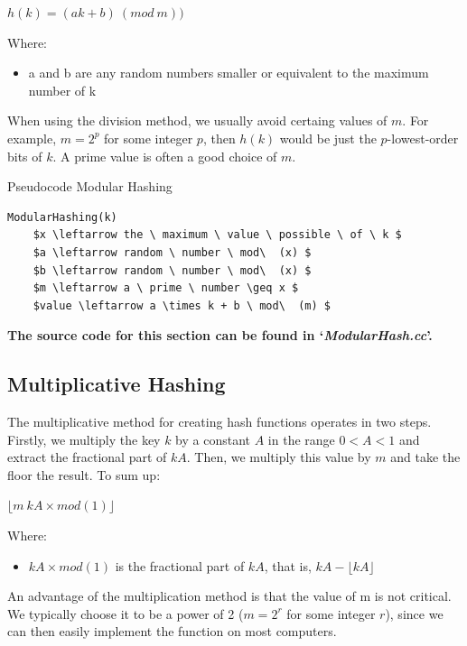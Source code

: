 \documentclass[12pt]{article}
\begin{document}
\begin{center} $h(k) = (ak+b)\  (mod \ m))$ \end{center}

Where: 
\begin{itemize}
\item a and b are any random numbers smaller or equivalent to the maximum number of k 
\end{itemize}

When using the division method, we usually avoid certaing values of $m$. For example, $m = 2^p$ for some integer $p$, then $h(k)$ would be just the $p$-lowest-order bits of $k$. A prime value is often a good choice of $m$.

\begin{center}
\begin{large}
Pseudocode Modular Hashing
\end{large}
\end{center}

\begin{lstlisting}[mathescape=true]
ModularHashing(k)
	$x \leftarrow the \ maximum \ value \ possible \ of \ k $
	$a \leftarrow random \ number \ mod\  (x) $
	$b \leftarrow random \ number \ mod\  (x) $
	$m \leftarrow a \ prime \ number \geq x $
	$value \leftarrow a \times k + b \ mod\  (m) $

\end{lstlisting}

\textbf{The source code for this section can be found in `\textit{ModularHash.cc}'.}
\bigskip

\subsection{Multiplicative Hashing}
The multiplicative method for creating hash functions operates in two steps.
Firstly, we multiply the key $k$ by a constant $A$ in the range $0<A<1$ and extract the fractional part of $kA$. Then, we multiply this value by $m$ and take the floor the result. To sum up:  

\begin{center}
 $ \lfloor m\ kA \times mod(1)  \rfloor$
\end{center}
Where:
\begin{itemize}
\item $kA  \times mod(1)$  is the fractional part of $kA$, that is, $kA- \lfloor kA \rfloor$
\end{itemize}
An advantage of the multiplication method is that the value of m is not critical. We typically choose it to be a power of 2 ($m = 2^r$ for some integer $r$), since we can then easily implement the function on most computers.
\end{document}
